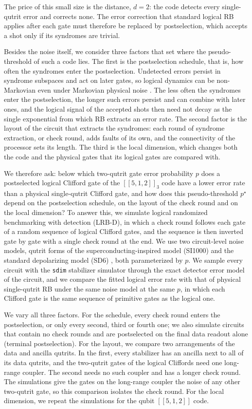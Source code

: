 The price of this small size is the distance, $d = 2$: the code detects every single-qutrit error and corrects none. The error correction that standard logical RB applies after each gate \cite{Combes2017} must therefore be replaced by postselection, which accepts a shot only if its syndromes are trivial.

Besides the noise itself, we consider three factors that set where the pseudo-threshold of such a code lies. The first is the postselection schedule, that is, how often the syndromes enter the postselection. Undetected errors persist in syndrome subspaces and act on later gates, so logical dynamics can be non-Markovian even under Markovian physical noise \cite{Ziyad2025}. The less often the syndromes enter the postselection, the longer such errors persist and can combine with later ones, and the logical signal of the accepted shots then need not decay as the single exponential from which RB extracts an error rate. The second factor is the layout of the circuit that extracts the syndromes: each round of syndrome extraction, or check round, adds faults of its own, and the connectivity of the processor sets its length. The third is the local dimension, which changes both the code and the physical gates that its logical gates are compared with.

We therefore ask: below which two-qutrit gate error probability $p$ does a postselected logical Clifford gate of the $[[5,1,2]]_3$ code have a lower error rate than a physical single-qutrit Clifford gate, and how does this pseudo-threshold $p^\star$ depend on the postselection schedule, on the layout of the check round and on the local dimension? To answer this, we simulate logical randomized benchmarking with detection (LRB-D), in which a check round follows each gate of a random sequence of logical Clifford gates, and the sequence is then inverted gate by gate with a single check round at the end. We use two circuit-level noise models, qutrit forms of the superconducting-inspired model (SI1000) and the standard depolarizing model (SD6) \cite{GidneyHoneycomb2021}, both parameterized by $p$. We sample every circuit with the \texttt{sdim} stabilizer simulator \cite{sdim} through the exact detector error model of the circuit, and we compare the fitted logical error rate with that of physical single-qutrit RB under the same noise model at the same $p$, in which each Clifford gate is the same sequence of primitive gates as the logical one.

We vary all three factors. For the schedule, every check round enters the postselection, or only every second, third or fourth one; we also simulate circuits that contain no check rounds and are postselected on the final data readout alone (terminal postselection). For the layout, we compare two arrangements of the data and ancilla qutrits. In the first, every stabilizer has an ancilla next to all of its data qutrits, and the two-qutrit gates of the logical Cliffords need one long-range coupler. The second needs no such coupler and has a longer check round. The simulations give the gates on the long-range coupler the noise of any other two-qutrit gate, so this comparison isolates the check round. For the local dimension, we repeat the simulations for the qubit $[[5,1,2]]$ code.

